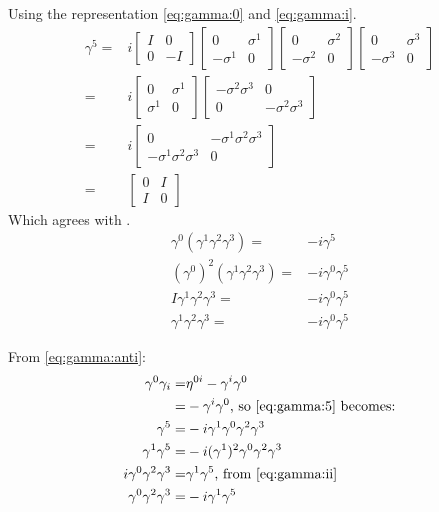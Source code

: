 \documentclass[]{article}
\begin{document}
Using the representation \eqref{eq:gamma:0} and \eqref{eq:gamma:i}.
\begin{align*}
	\gamma^5=& i \begin{bmatrix}
		I&0\\
		0&-I
	\end{bmatrix} \begin{bmatrix}
		0&\sigma^1\\
		-\sigma^1&0
	\end{bmatrix} \begin{bmatrix}
		0&\sigma^2\\
		-\sigma^2&0
	\end{bmatrix} \begin{bmatrix}
		0&\sigma^3\\
		-\sigma^3&0
	\end{bmatrix}\\
	=& i \begin{bmatrix}
		0&\sigma^1\\
		\sigma^1&0
	\end{bmatrix} \begin{bmatrix*}
		-\sigma^2 \sigma^3&0\\
		0&-\sigma^2 \sigma^3
	\end{bmatrix*}\\
	=& i \begin{bmatrix}
		0&-\sigma^1 \sigma^2 \sigma^3\\
		-\sigma^1 \sigma^2 \sigma^3&0
	\end{bmatrix}\\
	=& \begin{bmatrix}
		0&I\\
		I&0
	\end{bmatrix}
\end{align*}
Which agrees with \cite[II,(8)]{zee2010quantum}.
\begin{align*}
	\gamma^0 (\gamma^1 \gamma^2 \gamma^3) =& -i \gamma^5\\
	(\gamma^0)^2 (\gamma^1 \gamma^2 \gamma^3) =& -i \gamma^0 \gamma^5\\
	I \gamma^1 \gamma^2 \gamma^3 =& -i \gamma^0 \gamma^5\\
	\gamma^1 \gamma^2 \gamma^3 =& -i \gamma^0 \gamma^5
\end{align*}

From \eqref{eq:gamma:anti}:
\begin{align*}
	\gamma^0 \gamma_i =& \eta^{0i}-\gamma^i \gamma^0\\
	=& - \gamma^i\gamma^0 \text{, so \eqref{eq:gamma:5} becomes:}\\
	\gamma^5 =& - i \gamma^1 \gamma^0 \gamma^2 \gamma^3\\
	\gamma^1 \gamma^5 =& - i (\gamma^1)^2 \gamma^0 \gamma^2 \gamma^3\\
	i \gamma^0 \gamma^2 \gamma^3 =&\gamma^1 \gamma^5 \text{, from \eqref{eq:gamma:ii}}\\
	\gamma^0 \gamma^2 \gamma^3 =&-i\gamma^1 \gamma^5\\
\end{align*}
\end{document}
